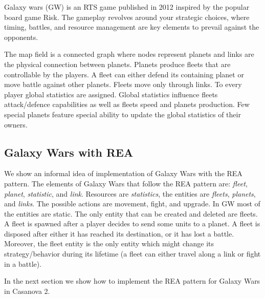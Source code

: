 Galaxy wars (GW) is an RTS game published in 2012 inspired by the popular board game Risk. The gameplay revolves around your strategic choices, where timing, battles, and resource management are key elements to prevail against the opponents.

The map field is a connected graph where nodes represent planets and links are the physical connection between planets. Planets produce fleets that are controllable by the players. A fleet can either defend its containing planet or move battle against other planets. Fleets move only through links. To every player global statistics are assigned. Global statistics influence fleets attack/defence capabilities as well as fleets speed and planets production. Few special planets feature special ability to update the global statistics of their owners.

\subsection{Galaxy Wars with REA}
We show an informal idea of implementation of Galaxy Wars with the REA pattern. The elements of Galaxy Wars that follow the REA pattern are: \textit{fleet}, \textit{planet}, \textit{statistic}, and \textit{link}. Resources are \textit{statistics}, the entities are \textit{fleets}, \textit{planets}, and \textit{links}. The possible actions are movement, fight, and upgrade. In GW most of the entities are static. The only entity that can be created and deleted are fleets. A fleet is spawned after a player decides to send some units to a planet. A fleet is disposed after either it has reached its destination, or it has lost a battle. Moreover, the fleet entity is the only entity which might change its strategy/behavior during its lifetime (a fleet can either travel along a link or fight in a battle).

In the next section we show how to implement the REA pattern for Galaxy Wars in Casanova 2.